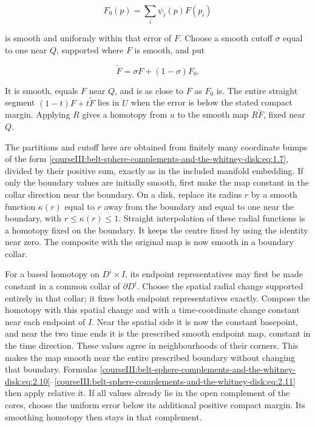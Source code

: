\begin{equation}
F_0(p)=\sum_i\psi_i(p)F(p_i)
\label{courseIII:belt-sphere-complements-and-the-whitney-disk:eq:2.10}
\end{equation}

is smooth and uniformly within that error of \(F\). Choose a smooth cutoff \(\sigma\) equal to one near \(Q\), supported where \(F\) is smooth, and put

\begin{equation}
\widetilde F=\sigma F+(1-\sigma)F_0.
\label{courseIII:belt-sphere-complements-and-the-whitney-disk:eq:2.11}
\end{equation}

It is smooth, equals \(F\) near \(Q\), and is as close to \(F\) as \(F_0\) is. The entire straight segment \((1-t)F+t\widetilde F\) lies in \(U\) when the error is below the stated compact margin. Applying \(R\) gives a homotopy from \(u\) to the smooth map \(R\widetilde F\), fixed near \(Q\).

The partitions and cutoff here are obtained from finitely many coordinate bumps of the form \eqref{courseIII:belt-sphere-complements-and-the-whitney-disk:eq:1.7}, divided by their positive sum, exactly as in the included manifold embedding. If only the boundary values are initially smooth, first make the map constant in the collar direction near the boundary. On a disk, replace its radius \(r\) by a smooth function \(\kappa(r)\) equal to \(r\) away from the boundary and equal to one near the boundary, with \(r\leq\kappa(r)\leq1\). Straight interpolation of these radial functions is a homotopy fixed on the boundary. It keeps the centre fixed by using the identity near zero. The composite with the original map is now smooth in a boundary collar.

For a based homotopy on \(D^i\times I\), its endpoint representatives may first be made constant in a common collar of \(\partial D^i\). Choose the spatial radial change supported entirely in that collar; it fixes both endpoint representatives exactly. Compose the homotopy with this spatial change and with a time-coordinate change constant near each endpoint of \(I\). Near the spatial side it is now the constant basepoint, and near the two time ends it is the prescribed smooth endpoint map, constant in the time direction. These values agree in neighbourhoods of their corners. This makes the map smooth near the entire prescribed boundary without changing that boundary. Formulas \eqref{courseIII:belt-sphere-complements-and-the-whitney-disk:eq:2.10}--\eqref{courseIII:belt-sphere-complements-and-the-whitney-disk:eq:2.11} then apply relative it. If all values already lie in the open complement of the cores, choose the uniform error below its additional positive compact margin. Its smoothing homotopy then stays in that complement.

